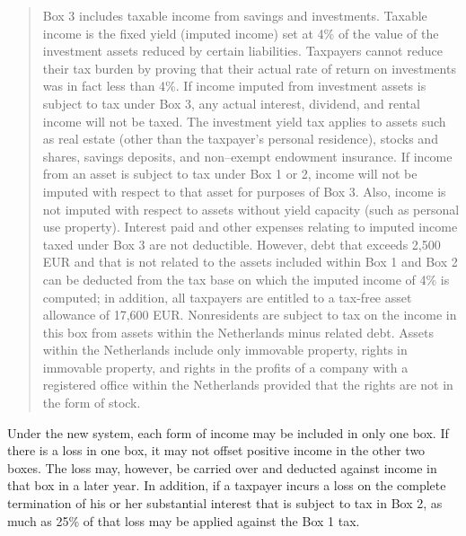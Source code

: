 \begin{select}
\begin{quote}
Box 3 includes taxable income from savings and investments. Taxable income is the fixed yield (imputed 
income) set at 4\% of the value of the investment assets reduced by certain liabilities. Taxpayers cannot 
reduce their tax burden by proving that their actual rate of return on investments was in fact less than 4\%. 
If income imputed from investment assets is subject to tax under Box 3, any actual interest, dividend, and 
rental income will not be taxed. The investment yield tax applies to assets such as real estate (other than the 
taxpayer's personal residence), stocks and shares, savings deposits, and non--exempt endowment insurance. 
If income from an asset is subject to tax under Box 1 or 2, income will not be imputed with respect to that 
asset for purposes of Box 3. Also, income is not imputed with respect to assets without yield capacity (such
as personal use property). Interest paid and other expenses relating to imputed income taxed under Box 3 are 
not deductible. However, debt that exceeds 2,500 EUR and that is not related to the assets included within 
Box 1 and Box 2 can be deducted from the tax base on which the imputed income of 4\% is computed; 
in addition, all taxpayers are entitled to a tax-free asset allowance of 17,600 EUR. Nonresidents are 
subject to tax on the income in this box from assets within the Netherlands minus related debt. Assets within 
the Netherlands include only immovable property, rights in immovable property, and rights in the profits of a 
company with a registered office within the Netherlands provided that the rights are not in the form of stock. 
\end{quote}

Under the new system, each form of income may be included in only one box. If there is a loss in one box, it may not 
offset positive income in the other two boxes. The loss may, however, be carried over and deducted against income in that 
box in a later year. In addition, if a taxpayer incurs a loss on the complete termination of his or her substantial interest that 
is subject to tax in Box 2, as much as 25\% of that loss may be applied against the Box 1 tax. 


\end{select}
